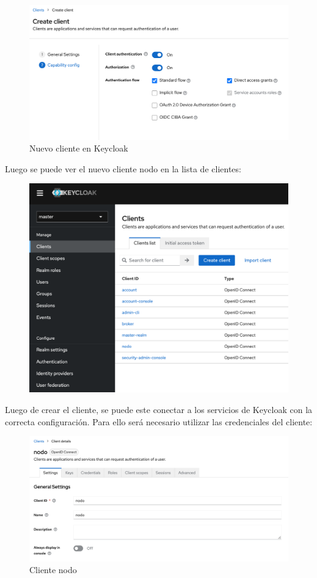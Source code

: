 \begin{figure}[H]
	\centering
	\includegraphics[width=1\linewidth]{Graphics/client_new2}
	\caption{Nuevo cliente en Keycloak}
	\label{fig:clientnew2}
\end{figure}

Luego se puede ver el nuevo cliente nodo en la lista de clientes:

\begin{figure}[H]
	\centering
	\includegraphics[width=0.9\linewidth]{Graphics/client_list}
	\caption{}
	\label{fig:clientlist}
\end{figure}

Luego de crear el cliente, se puede este conectar a los servicios de Keycloak con la correcta configuración. Para ello será necesario utilizar las credenciales del cliente:

\begin{figure}[H]
	\centering
	\includegraphics[width=0.9\linewidth]{Graphics/client_nodo}
	\caption{Cliente nodo}
	\label{fig:clientnodo}
\end{figure}

